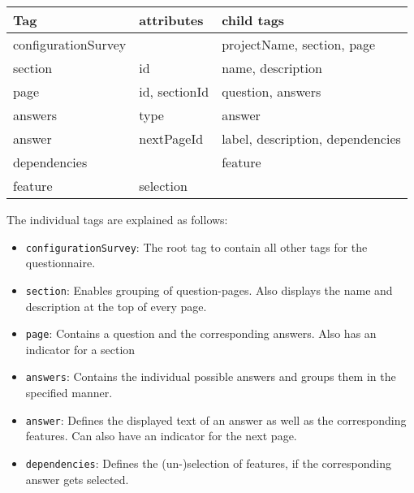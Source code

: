 \begin{tabulary}{\linewidth}{LLL}
\textbf{Tag} & \textbf{attributes} & \textbf{child tags}\\
\hline
configurationSurvey & & projectName, section, page\\
section & id & name, description\\
page & id, sectionId & question, answers\\
answers & type & answer\\
answer & nextPageId & label, description, dependencies\\
dependencies & & feature\\
feature & selection & \\
\end{tabulary}\vspace{2.5em}

The individual tags are explained as follows:

\begin{itemize}
\item \texttt{configurationSurvey}: The root tag to contain all other tags for the questionnaire.
\item \texttt{section}: Enables grouping of question-pages. Also displays the name and description at the top of every page.
\item \texttt{page}: Contains a question and the corresponding answers. Also has an indicator for a section
\item \texttt{answers}: Contains the individual possible answers and groups them in the specified manner.
\item \texttt{answer}: Defines the displayed text of an answer as well as the corresponding features. Can also have an indicator for the next page.
\item \texttt{dependencies}: Defines the (un-)selection of features, if the corresponding answer gets selected.
\end{itemize}

